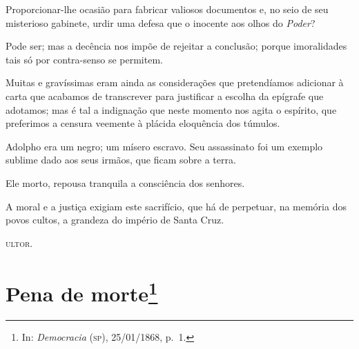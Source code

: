 Proporcionar-lhe ocasião para fabricar valiosos documentos e, no seio de
seu misterioso gabinete, urdir uma defesa que o inocente aos olhos do
\emph{Poder}?

Pode ser; mas a decência nos impõe de rejeitar a conclusão; porque
imoralidades tais só por contra-senso se permitem.

Muitas e gravíssimas eram ainda as considerações que pretendíamos
adicionar à carta que acabamos de transcrever para justificar a escolha
da epígrafe que adotamos; mas é tal a indignação que neste momento nos
agita o espírito, que preferimos a censura veemente à plácida eloquência
dos túmulos.

Adolpho era um negro; um mísero escravo. Seu assassinato foi um exemplo
sublime dado aos seus irmãos, que ficam sobre a terra.

Ele morto, repousa tranquila a consciência dos senhores.

A moral e a justiça exigiam este sacrifício, que há de perpetuar, na
memória dos povos cultos, a grandeza do império de Santa Cruz.

\textsc{ultor}.

\chapter{Pena de morte\footnote{In: \emph{Democracia} (\textsc{sp}), 25/01/1868, p.~1.}}

